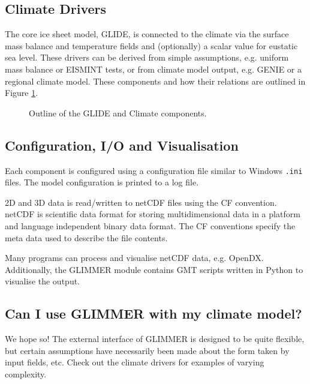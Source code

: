 \subsection{Climate Drivers}
The core ice sheet model, GLIDE, is connected to the climate via the surface mass balance and temperature fields and (optionally) a scalar value for eustatic sea level. These drivers can be derived from simple assumptions, e.g. uniform mass balance or EISMINT tests, or from climate model output, e.g. GENIE or a regional climate model. These components and how their relations are outlined in Figure \ref{ug.glide}.

\begin{figure}[htbp]
 \begin{center}
 \end{center}
 \caption{Outline of the GLIDE and Climate components.}
\label{ug.glide}
\end{figure}

\subsection{Configuration, I/O and Visualisation}
Each component is configured using a configuration file similar to Windows \texttt{.ini} files. The model configuration is printed to a log file. 

2D and 3D data is read/written to netCDF files using the CF convention. netCDF is scientific data format for storing multidimensional data in a platform and language independent binary data format. The CF conventions specify the meta data used to describe the file contents.

Many programs can process and visualise netCDF data, e.g. OpenDX. Additionally, the GLIMMER module contains GMT scripts written in Python to visualise the output.

\subsection{Can I use GLIMMER with my climate model?}
We hope so! The external interface of GLIMMER is designed to be quite
flexible, but certain assumptions have necessarily been made about the form
taken by input fields, etc. Check out the climate drivers for examples of varying complexity.
